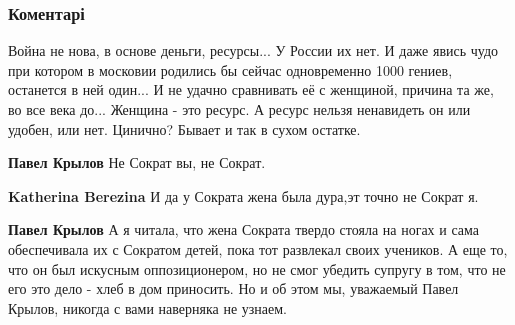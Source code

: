  
 
 
 
 
\subsubsection{Коментарі}

\begin{itemize}
 

Война не нова, в основе деньги, ресурсы... У России их нет. И даже явись чудо при
котором в московии родились бы сейчас одновременно 1000 гениев, останется в ней
один... И не удачно сравнивать её с женщиной, причина та же, во все века
до... Женщина - это ресурс. А ресурс нельзя ненавидеть он или удобен, или
нет. Цинично? Бывает и так в сухом остатке.

\begin{itemize}
 
\textbf{Павел Крылов} Не Сократ вы, не Сократ.

 
\textbf{Katherina Berezina} И да у Сократа жена была дура,эт точно не Сократ я.

 
\textbf{Павел Крылов} А я читала, что жена Сократа твердо стояла на ногах и
сама обеспечивала их с Сократом детей, пока тот развлекал своих учеников. А еще
то, что он был искусным оппозиционером, но не смог убедить супругу в том, что
не его это дело - хлеб в дом приносить. Но и об этом мы, уважаемый Павел
Крылов, никогда с вами наверняка не узнаем.


\end{itemize}
\end{itemize}
